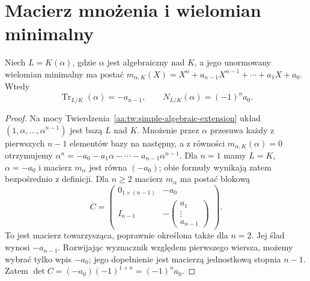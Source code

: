\section{Macierz mnożenia i wielomian minimalny}
\begin{twierdzenie}
\label{aa:tw:trace-norm-companion}
Niech $L=K(\alpha)$, gdzie $\alpha$ jest algebraiczny nad $K$,
a jego unormowany wielomian minimalny ma postać
$m_{\alpha,K}(X)=X^n+a_{n-1}X^{n-1}+\cdots+a_1X+a_0$.
Wtedy
\[
\operatorname{Tr}_{L/K}(\alpha)=-a_{n-1},\qquad
N_{L/K}(\alpha)=(-1)^n a_0.
\]
\end{twierdzenie}
\begin{proof}
Na mocy Twierdzenia~\ref{aa:tw:simple-algebraic-extension}
układ $(1,\alpha,\ldots,\alpha^{n-1})$ jest bazą $L$ nad $K$.
Mnożenie przez $\alpha$ przesuwa każdy z pierwszych $n-1$
elementów bazy na następny, a z równości $m_{\alpha,K}(\alpha)=0$
otrzymujemy
$\alpha^n=-a_0-a_1\alpha-\cdots-a_{n-1}\alpha^{n-1}$.
Dla $n=1$ mamy $L=K$, $\alpha=-a_0$ i macierz
$m_\alpha$ jest równa $(-a_0)$; obie formuły
wynikają zatem bezpośrednio z definicji.
Dla $n\ge2$ macierz $m_\alpha$ ma postać blokową
\[
C=\begin{pmatrix}
0_{1\times(n-1)}&-a_0\\
I_{n-1}&-\begin{pmatrix}a_1\\\vdots\\a_{n-1}\end{pmatrix}
\end{pmatrix}.
\]
To jest macierz towarzysząca, poprawnie określona także
dla $n=2$. Jej ślad wynosi $-a_{n-1}$.
Rozwijając wyznacznik względem pierwszego wiersza,
możemy wybrać tylko wpis $-a_0$; jego dopełnienie
jest macierzą jednostkową stopnia $n-1$.
Zatem $\det C=(-a_0)(-1)^{1+n}=(-1)^n a_0$.
\end{proof}

